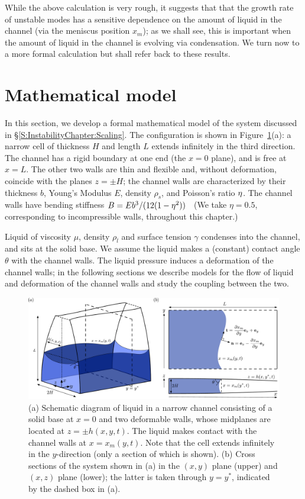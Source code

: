While the above calculation is very rough, it suggests that that the growth rate of unstable modes has a sensitive dependence on the amount of liquid in the channel (via the meniscus position $x_m$); as we shall see, this is important when the amount of liquid in the channel is evolving via condensation. We turn now to a more formal calculation but shall refer back to these results.


\section{Mathematical model}
In this section, we develop a formal mathematical model of the system discussed in \S\ref{S:InstabilityChapter:Scaling}. The configuration is shown in Figure~\ref{fig:InstabilityChapter:Modelling:Schematic}(a): a narrow cell of thickness $H$ and length $L$ extends infinitely in the third direction. The channel has a rigid boundary at one end (the $x = 0$ plane), and is free at $x = L$. The other two walls are thin and flexible and, without deformation, coincide with the planes $z = \pm H$; the channel walls are characterized by their thickness $b$, Young's Modulus $E$, density $\rho_s$, and Poisson's ratio $\eta$. The channel walls have bending stiffness $B = Eb^3 / (12(1-\eta^2))$~\citep{Timoshenko1959} (We take $\eta = 0.5$, corresponding to incompressible walls, throughout this chapter.)

 Liquid of viscosity $\mu$, density $\rho_l$ and surface tension $\gamma$ condenses into the channel, and sits at the solid base. We assume the liquid makes a (constant) contact angle $\theta$ with the channel walls. The liquid pressure induces a deformation of the channel walls; in the following sections we describe models for the flow of liquid and deformation of the channel walls and study the coupling between the two.

\begin{figure}[t]
\centering
\includegraphics[scale=0.39]{Schematic_two_cross_sections}
\caption{(a) Schematic diagram of liquid in a narrow channel consisting of a solid base at $x =0$ and two deformable walls, whose midplanes are located at $z = \pm h(x,y,t)$. The liquid makes contact with the channel walls at $x = x_m(y,t)$. Note that the cell extends infinitely in the $y$-direction (only a section of which is shown). (b) Cross sections of the system shown in (a) in the $(x,y)$ plane (upper) and $(x,z)$ plane (lower); the latter is taken through $y = y^*$, indicated by the dashed box in (a).}
\label{fig:InstabilityChapter:Modelling:Schematic}
\end{figure}


